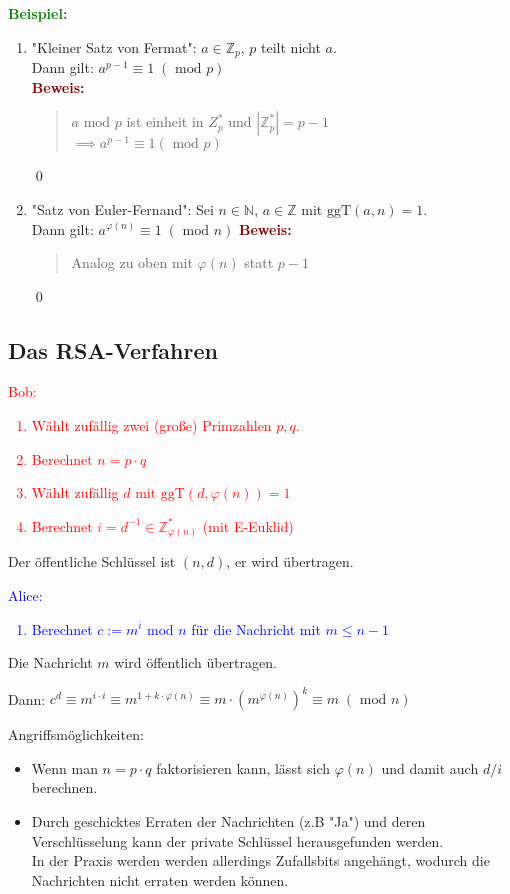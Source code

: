 \documentclass{article}
\newcommand{\red}[1]{\textcolor{red}{#1}}
\newcommand{\blue}[1]{\textcolor{blue}{#1}}
\newcommand{\green}[1]{\textcolor{green}{#1}}
\newcommand{\maroon}[1]{\textcolor{maroon}{#1}}
\newcommand{\ex}{\green{\textbf{Beispiel: }}}
\newcommand{\pr}[1]{\maroon{\textbf{Beweis: }}\begin{quote}#1\end{quote}\qed}
\newcommand{\N}{\mathbb{N}}
\newcommand{\Z}{\mathbb{Z}}
\renewcommand{\mod}{\text{ mod }}
\newcommand{\ggt}{\text{ggT}}
\begin{document}
\ex \begin{enumerate}
    \item "Kleiner Satz von Fermat": $a \in \Z_p$, $p$ teilt nicht $a$.\\
    Dann gilt: $a^{p-1} \equiv 1 \; (\mod p)$\\
    \pr{
        $a \mod p$ ist einheit in $Z_p^*$ und $|\Z_p^*| = p - 1$\\
        $\implies a^{p-1} \equiv 1 (\mod p)$
    }
    \item "Satz von Euler-Fernand": Sei $n \in \N$, $a \in \Z$ mit $\ggt(a,n) = 1$.\\
    Dann gilt: $a^{\varphi(n)} \equiv 1 \; (\mod n)$
    \pr{
        Analog zu oben mit $\varphi(n)$ statt $p-1$
    }
\end{enumerate}

\subsection{Das RSA-Verfahren}

\red{
    Bob:
    \begin{enumerate}
        \item Wählt zufällig zwei (große) Primzahlen $p,q$.
        \item Berechnet $n = p \cdot q$
        \item Wählt zufällig $d$ mit $\ggt(d, \varphi(n)) = 1$
        \item Berechnet $i = d^{-1} \in \Z_{\varphi(n)}^*$ (mit E-Euklid)
    \end{enumerate}
}
Der öffentliche Schlüssel ist $(n,d)$, er wird übertragen.\\
\blue{
    Alice:
    \begin{enumerate}
        \item Berechnet $c := m^i \mod n$ für die Nachricht mit $m \le n-1$
    \end{enumerate}
}
Die Nachricht $m$ wird öffentlich übertragen.

Dann: $c^d \equiv m^{i \cdot i} \equiv m^{1 + k \cdot \varphi(n)} \equiv m \cdot (m^{\varphi(n)})^k \equiv m \; (\mod n)$

Angriffsmöglichkeiten:
\begin{itemize}
    \item Wenn man $n = p \cdot q$ faktorisieren kann, lässt sich $\varphi(n)$ und damit auch $d/i$ berechnen.
    \item Durch geschicktes Erraten der Nachrichten (z.B "Ja") und deren Verschlüsselung kann der private Schlüssel herausgefunden werden.\\
    In der Praxis werden werden allerdings Zufallsbits angehängt, wodurch die Nachrichten nicht erraten werden können.
\end{itemize}
\end{document}
